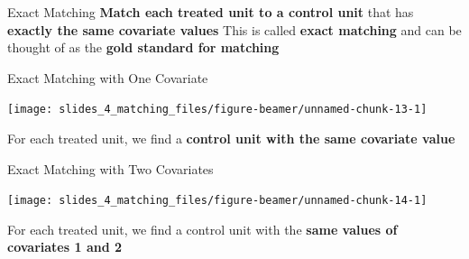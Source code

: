 \documentclass[
  ignorenonframetext,
  aspectratio=169, handout]{beamer}
\newcommand{\brf}[1]{\textcolor{brickred}{\textbf{#1}}}
\begin{document}
\begin{frame}{Exact Matching}
\protect\hypertarget{exact-matching}{}
\brf{Match each treated unit to a control unit} that has \textbf{exactly
the same covariate values} \vfill This is called \brf{exact matching}
and can be thought of as the \textbf{gold standard
for matching}
\end{frame}

\begin{frame}{Exact Matching with One Covariate}
\protect\hypertarget{exact-matching-with-one-covariate}{}
\begin{center}\texttt{[image: slides\_4\_matching\_files/figure-beamer/unnamed-chunk-13-1]} \end{center}

For each treated unit, we find a \textbf{control unit with the same
covariate value}
\end{frame}

\begin{frame}{Exact Matching with Two Covariates}
\protect\hypertarget{exact-matching-with-two-covariates}{}
\begin{center}\texttt{[image: slides\_4\_matching\_files/figure-beamer/unnamed-chunk-14-1]} \end{center}

For each treated unit, we find a control unit with the \textbf{same
values of covariates 1 and 2}
\end{frame}
\end{document}
